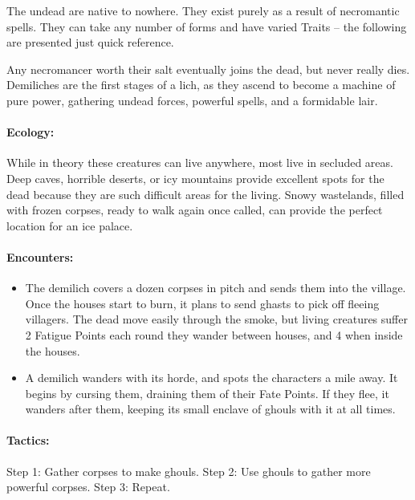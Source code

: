 \begin{multicols}{2}

\noindent
The undead are native to nowhere.
They exist purely as a result of necromantic spells.
They can take any number of forms and have varied Traits -- the following are presented just quick reference.

\label{demilich}

Any necromancer worth their salt eventually joins the dead, but never really dies.
Demiliches are the first stages of a lich, as they ascend to become a machine of pure power, gathering undead forces, powerful spells, and a formidable lair.

\paragraph{Ecology:} While in theory these creatures can live anywhere, most live in secluded areas.
Deep caves, horrible deserts, or icy mountains provide excellent spots for the dead because they are such difficult areas for the living.
Snowy wastelands, filled with frozen corpses, ready to walk again once called, can provide the perfect location for an ice palace.

\paragraph{Encounters:}

\begin{itemize}

  \item
  The demilich covers a dozen corpses in pitch and sends them into the village.
  Once the houses start to burn, it plans to send ghasts to pick off fleeing villagers.
  The dead move easily through the smoke, but living creatures suffer 2 Fatigue Points each round they wander between houses, and 4 when inside the houses.
  \item
  A demilich wanders with its horde, and spots the characters a mile away.
  It begins by cursing them, draining them of their Fate Points.
  If they flee, it wanders after them, keeping its small enclave of ghouls with it at all times.

\end{itemize}

\paragraph{Tactics:}
Step 1: Gather corpses to make ghouls.
Step 2: Use ghouls to gather more powerful corpses.
Step 3: Repeat.


\end{multicols}
